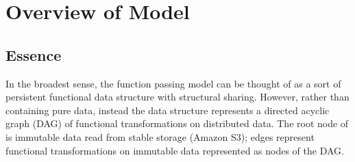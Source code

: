 \documentclass{jfp1}
\begin{document}


%
%
%
%
%
%
%

\section{Overview of Model}
\label{sec:basic-model}

\subsection{Essence}

In the broadest sense, the function passing model can be thought of as a sort of
persistent functional data structure with structural sharing. However, rather
than containing pure data, instead the data structure represents a directed
acyclic graph (DAG) of functional transformations on distributed data. The root
node of is immutable data read from stable storage (\eg Amazon S3); edges
represent functional transformations on immutable data represented as nodes of
the DAG.
\end{document}
